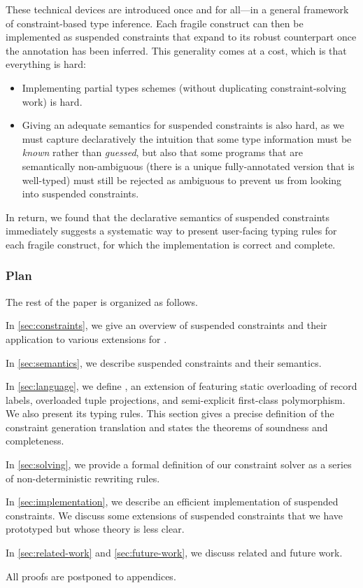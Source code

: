 \documentclass[acmsmall,screen,nonacm]{acmart}
\begin{document}
These technical devices are introduced once and for all---in a general
framework of constraint-based type inference. Each fragile \ML construct can
then be implemented as suspended constraints that expand to its robust
counterpart once the annotation has been inferred. This generality comes at
a cost, which is that everything is hard:
\begin{itemize}
\item Implementing partial types schemes (without duplicating
  constraint-solving work) is hard.
\item Giving an adequate semantics for suspended constraints is also hard, as we
  must capture declaratively the intuition that some type information must be
  \emph{known} rather than \emph{guessed}, but also that some programs
  that are semantically non-ambiguous (there is a unique fully-annotated
  version that is well-typed) must still be rejected as ambiguous to prevent
  us from looking into suspended constraints.
\end{itemize}
In return, we found that the declarative semantics of suspended constraints
immediately suggests a systematic way to present user-facing typing rules
for each fragile construct, for which the implementation is correct and
complete.

\subsubsection* {Plan}

The rest of the paper is organized as follows.
\begin{enumerate*}[label={}]
\item
  In \cref{sec:constraints}, we give an overview of suspended constraints
  and their application to various extensions for \ML.
\item
  In \cref{sec:semantics}, we describe suspended constraints and their semantics.
\item
  In \cref{sec:language}, we define \OML, an extension of \ML featuring static
  overloading of record labels, overloaded tuple projections, and
  semi-explicit first-class polymorphism. We also present its typing rules.
  This section gives a precise definition of the constraint generation
  translation and states the theorems of soundness and completeness.
\item
  In \cref{sec:solving}, we provide a formal definition of our constraint
  solver as a series of non-deterministic rewriting rules.
\item In \cref{sec:implementation}, we describe an efficient implementation
  of suspended constraints. We discuss some extensions of suspended
  constraints that we have prototyped but whose theory is less clear.
\item
  In \cref{sec:related-work} and \cref{sec:future-work}, we discuss related
  and future work.
\end{enumerate*}
All proofs are postponed to appendices.
\end{document}
